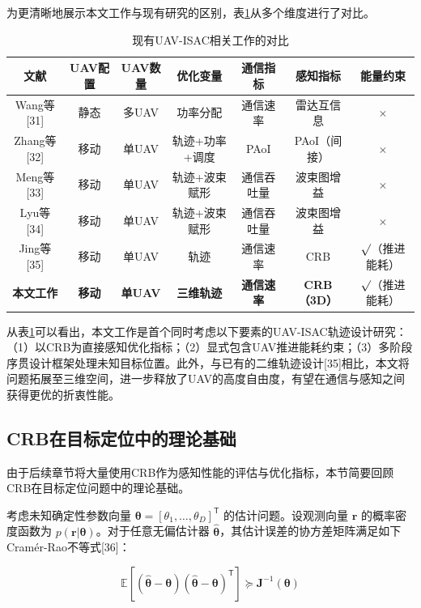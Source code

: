 为更清晰地展示本文工作与现有研究的区别，表\ref{tab:lit_comparison}从多个维度进行了对比。

\begin{table}[htbp]
\centering
\caption{现有UAV-ISAC相关工作的对比}
\label{tab:lit_comparison}
\renewcommand{\arraystretch}{1.3}
\begin{tabular}{|c|c|c|c|c|c|c|}
\hline
\textbf{文献} & \textbf{UAV配置} & \textbf{UAV数量} & \textbf{优化变量} & \textbf{通信指标} & \textbf{感知指标} & \textbf{能量约束} \\
\hline
Wang等[31] & 静态 & 多UAV & 功率分配 & 通信速率 & 雷达互信息 & $\times$ \\
\hline
Zhang等[32] & 移动 & 单UAV & 轨迹+功率+调度 & PAoI & PAoI（间接） & $\times$ \\
\hline
Meng等[33] & 移动 & 单UAV & 轨迹+波束赋形 & 通信吞吐量 & 波束图增益 & $\times$ \\
\hline
Lyu等[34] & 移动 & 单UAV & 轨迹+波束赋形 & 通信吞吐量 & 波束图增益 & $\times$ \\
\hline
Jing等[35] & 移动 & 单UAV & 轨迹 & 通信速率 & CRB & $\surd$（推进能耗） \\
\hline
\textbf{本文工作} & \textbf{移动} & \textbf{单UAV} & \textbf{三维轨迹} & \textbf{通信速率} & \textbf{CRB（3D）} & $\surd$（推进能耗） \\
\hline
\end{tabular}
\end{table}

从表\ref{tab:lit_comparison}可以看出，本文工作是首个同时考虑以下要素的UAV-ISAC轨迹设计研究：（1）以CRB为直接感知优化指标；（2）显式包含UAV推进能耗约束；（3）多阶段序贯设计框架处理未知目标位置。此外，与已有的二维轨迹设计[35]相比，本文将问题拓展至三维空间，进一步释放了UAV的高度自由度，有望在通信与感知之间获得更优的折衷性能。

\subsection{CRB在目标定位中的理论基础}

由于后续章节将大量使用CRB作为感知性能的评估与优化指标，本节简要回顾CRB在目标定位问题中的理论基础。

考虑未知确定性参数向量 $\bm{\theta}=[\theta_1,\ldots,\theta_D]^{\mathsf{T}}$ 的估计问题。设观测向量 $\mathbf{r}$ 的概率密度函数为 $p(\mathbf{r}|\bm{\theta})$。对于任意无偏估计器 $\hat{\bm{\theta}}$，其估计误差的协方差矩阵满足如下Cram\'{e}r-Rao不等式[36]：

\begin{equation}
\mathbb{E}\left[(\hat{\bm{\theta}}-\bm{\theta})(\hat{\bm{\theta}}-\bm{\theta})^{\mathsf{T}}\right]\succeq\mathbf{J}^{-1}(\bm{\theta})
\label{eq:crb_general}
\end{equation}

